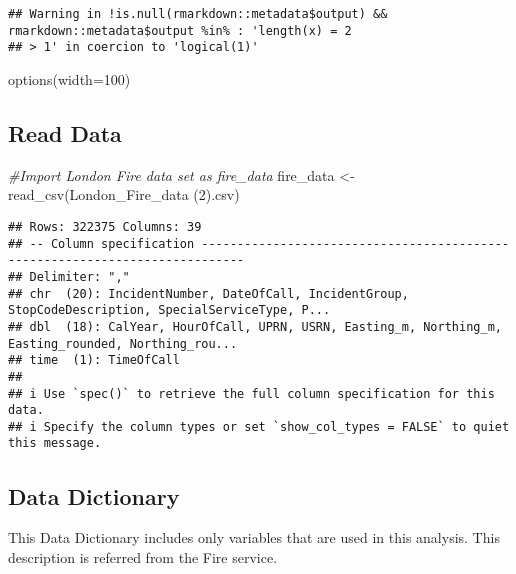 \documentclass[
]{article}
\newenvironment{Shaded}{\begin{snugshade}}{\end{snugshade}}
\newcommand{\AttributeTok}[1]{\textcolor[rgb]{0.77,0.63,0.00}{#1}}
\newcommand{\CommentTok}[1]{\textcolor[rgb]{0.56,0.35,0.01}{\textit{#1}}}
\newcommand{\DecValTok}[1]{\textcolor[rgb]{0.00,0.00,0.81}{#1}}
\newcommand{\FunctionTok}[1]{\textcolor[rgb]{0.00,0.00,0.00}{#1}}
\newcommand{\NormalTok}[1]{#1}
\newcommand{\OtherTok}[1]{\textcolor[rgb]{0.56,0.35,0.01}{#1}}
\newcommand{\StringTok}[1]{\textcolor[rgb]{0.31,0.60,0.02}{#1}}
\begin{document}
\begin{verbatim}
## Warning in !is.null(rmarkdown::metadata$output) && rmarkdown::metadata$output %in% : 'length(x) = 2
## > 1' in coercion to 'logical(1)'
\end{verbatim}

\begin{Shaded}
\begin{Highlighting}[]
\FunctionTok{options}\NormalTok{(}\AttributeTok{width=}\DecValTok{100}\NormalTok{)}
\end{Highlighting}
\end{Shaded}

\hypertarget{read-data}{%
\subsection{Read Data}\label{read-data}}

\begin{Shaded}
\begin{Highlighting}[]
\CommentTok{\#Import London Fire data set as fire\_data}
\NormalTok{fire\_data }\OtherTok{\textless{}{-}} \FunctionTok{read\_csv}\NormalTok{(}\StringTok{\textquotesingle{}London\_Fire\_data (2).csv\textquotesingle{}}\NormalTok{)}
\end{Highlighting}
\end{Shaded}

\begin{verbatim}
## Rows: 322375 Columns: 39
## -- Column specification ----------------------------------------------------------------------------
## Delimiter: ","
## chr  (20): IncidentNumber, DateOfCall, IncidentGroup, StopCodeDescription, SpecialServiceType, P...
## dbl  (18): CalYear, HourOfCall, UPRN, USRN, Easting_m, Northing_m, Easting_rounded, Northing_rou...
## time  (1): TimeOfCall
## 
## i Use `spec()` to retrieve the full column specification for this data.
## i Specify the column types or set `show_col_types = FALSE` to quiet this message.
\end{verbatim}

\hypertarget{data-dictionary}{%
\subsection{Data Dictionary}\label{data-dictionary}}

This Data Dictionary includes only variables that are used in this
analysis. This description is referred from the Fire service.
\end{document}
